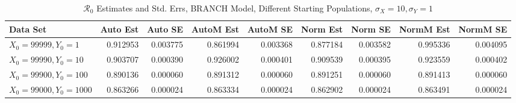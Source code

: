 \documentclass[12pt]{article}
\newcommand{\rr}{\ensuremath{\mathcal{R}_0}}
\begin{document}
\begin{table}[H]
	
	\caption{$\rr$ Estimates and Std. Errs, BRANCH Model,
		Different Starting Populations, 
		$\sigma_X = 10, \sigma_Y = 1$}
	\begin{footnotesize}
		\hskip -1.7cm
		\begin{tabular}{l|r|r|r|r|r|r|r|r}
			\hline
			Data Set & Auto Est & Auto SE & AutoM Est & AutoM SE & Norm Est & Norm SE & NormM Est & NormM SE\\
			\hline
			$X_0 = 99999, Y_0 = 1$ & 0.912953 & 0.003775 & 0.861994 & 0.003368 & 0.877184 & 0.003582 & 0.995336 & 0.004095\\
			\hline
			$X_0 = 99990, Y_0 = 10$ & 0.903707 & 0.000390 & 0.926002 & 0.000401 & 0.909539 & 0.000395 & 0.923559 & 0.000402\\
			\hline
			$X_0 = 99900, Y_0 = 100$ & 0.890136 & 0.000060 & 0.891312 & 0.000060 & 0.891251 & 0.000060 & 0.891413 & 0.000060\\
			\hline
			$X_0 = 99000, Y_0 = 1000$ & 0.863266 & 0.000024 & 0.863334 & 0.000024 & 0.862902 & 0.000024 & 0.863491 & 0.000024\\
			\hline
		\end{tabular}
	\end{footnotesize}
\end{table}
\end{document}
